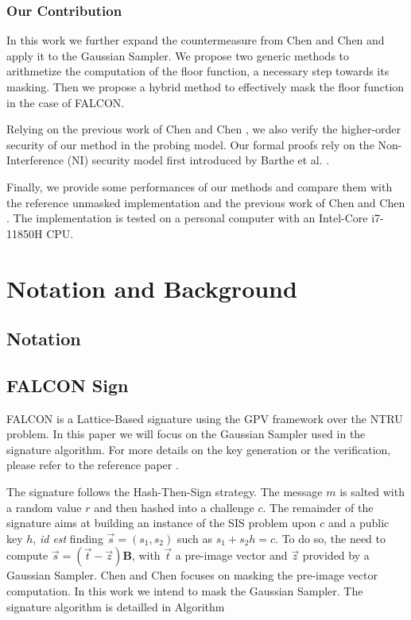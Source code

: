 \documentclass[runningheads]{llncs}
\begin{document}
\subsubsection{Our Contribution}
In this work we further expand the countermeasure from Chen and Chen \cite{Chen_Chen_2024} and apply it to the Gaussian Sampler. We propose two generic methods to arithmetize the computation of the floor function, a necessary step towards its masking. Then we propose a hybrid method to effectively mask the floor function in the case of FALCON.

\medskip

Relying on the previous work of Chen and Chen \cite{Chen_Chen_2024}, we also verify the higher-order security of our method in the probing model. Our formal proofs rely on the Non-Interference (NI) security model first introduced by Barthe et al. \cite{10.1145/2976749.2978427}.

\medskip

Finally, we provide some performances of our methods and compare them with the reference unmasked implementation and the previous work of Chen and Chen \cite{Chen_Chen_2024}. The implementation is tested on a personal computer with an Intel-Core i7-11850H CPU.


\section{Notation and Background}\label{sec:background}
\subsection{Notation}
\subsection{FALCON Sign}
FALCON \cite{prest2020falcon} is a Lattice-Based signature using the GPV framework over the NTRU problem. In this paper we will focus on the Gaussian Sampler used in the signature algorithm. For more details on the key generation or the verification, please refer to the reference paper \cite{prest2020falcon}.

\medskip

\noindent The signature follows the Hash-Then-Sign strategy. The message $m$ is salted with a random value $r$ and then hashed into a challenge $c$. The remainder of the signature aims at building an instance of the SIS problem upon $c$ and a public key $h$, \emph{id est} finding $\vec{s} =(s_1,s_2)$ such as $s_1 + s_2 h = c$. To do so, the need to compute $\vec{s} = (\vec{t}-\vec{z})\mathbf{B}$, with $\vec{t}$ a pre-image vector and $\vec{z}$ provided by a Gaussian Sampler. Chen and Chen \cite{Chen_Chen_2024} focuses on masking the pre-image vector computation. In this work we intend to mask the Gaussian Sampler. The signature algorithm is detailled in Algorithm 
\end{document}
